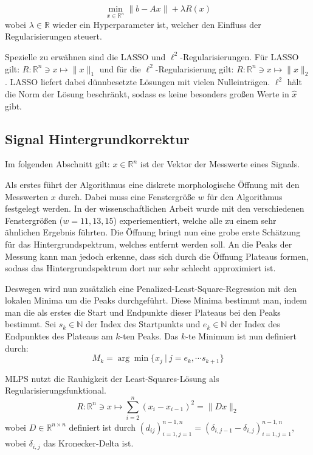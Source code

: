 \documentclass{article}
\newcommand{\R}[0]{\mathbb{R}}
\newcommand{\N}[0]{\mathbb{N}}
\theoremstyle{plain}
\theoremstyle{definition}
\begin{document}
\begin{equation}
    \min\limits_{x \in \R^n} \lVert b - Ax \rVert + \lambda R(x)
\end{equation}
wobei $\lambda \in \R$ wieder ein Hyperparameter ist, welcher den Einfluss der Regularisierungen steuert.

Spezielle zu erwähnen sind die LASSO und $\ell^2$-Regularisierungen. Für LASSO gilt: $R: \R^n \ni x \mapsto \lVert x \rVert_1$ und für die $\ell^2$-Regularisierung gilt: $R: \R^n \ni x \mapsto \lVert x \rVert_2$.
LASSO liefert dabei dünnbesetzte Lösungen mit vielen Nulleinträgen. 
$\ell^2$ hält die Norm der Lösung beschränkt, sodass es keine besonders großen Werte in $\hat{x}$ gibt.

\cite[S. 184f.]{strang2019linear}

\subsection{Signal Hintergrundkorrektur}

Im folgenden Abschnitt gilt: $x \in \R^n$ ist der Vektor der Messwerte eines Signals. 

Als erstes führt der Algorithmus eine diskrete morphologische Öffnung mit den Messwerten $x$ durch. Dabei muss eine Fenstergröße $w$ für den Algorithmus festgelegt werden.
In der wissenschaftlichen Arbeit wurde mit den verschiedenen Fenstergrößen ($w=11,13,15$) experiementiert, welche alle zu einem sehr ähnlichen Ergebnis führten.
Die Öffnung bringt nun eine grobe erste Schätzung für das Hintergrundspektrum, welches entfernt werden soll.
An die Peaks der Messung kann man jedoch erkenne, dass sich durch die Öffnung Plateaus formen, sodass das Hintergrundspektrum dort nur sehr schlecht approximiert ist.

Deswegen wird nun zusätzlich eine Penalized-Least-Square-Regression mit den lokalen Minima um die Peaks durchgeführt.
Diese Minima bestimmt man, indem man die als erstes die Start und Endpunkte dieser Plateaus bei den Peaks bestimmt.
Sei $s_k \in \N$ der Index des Startpunkts und $e_k \in \N$ der Index des Endpunktes des Plateaus am $k$-ten Peaks. Das $k$-te Minimum ist nun definiert durch:
\begin{equation}
    M_k = \arg\min \{x_j \: | \: j=e_k,\cdots s_{k+1}\}
\end{equation}

MLPS nutzt die Rauhigkeit der Least-Squares-Lösung als Regularisierungsfunktional.
\begin{equation}
    R: \R^n \ni x \mapsto \sum_{i=2}^{n} (x_i - x_{i-1})^2 = \lVert Dx \rVert_2
\end{equation}
wobei $D \in \R^{n\times n}$ definiert ist durch $(d_{ij})_{i=1,j=1}^{n-1,n} = (\delta_{i,j-1} - \delta_{i,j})_{i=1,j=1}^{n-1,n}$, wobei $\delta_{i,j}$ das Kronecker-Delta ist.
\end{document}
